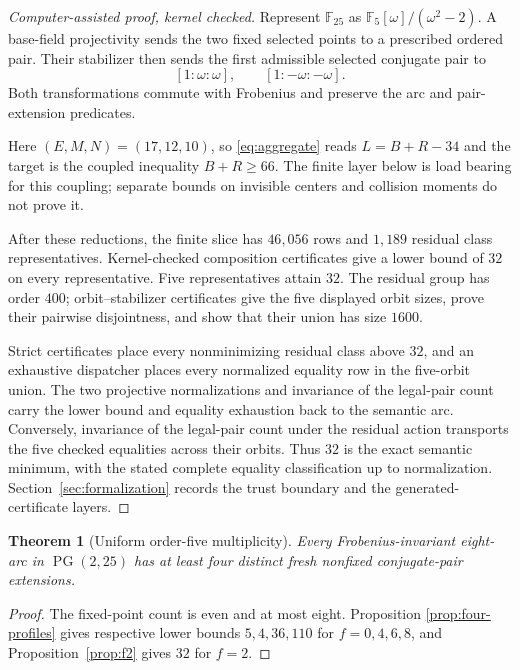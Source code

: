 \documentclass[11pt]{article}
\newtheorem{theorem}{Theorem}[section]
\theoremstyle{definition}
\theoremstyle{remark}
\newcommand{\PG}{\operatorname{PG}}
\newcommand{\F}{\mathbb{F}}
\begin{document}
\begin{proof}[Computer-assisted proof, kernel checked]
Represent $\F_{25}$ as $\F_5[\omega]/(\omega^2-2)$.  A base-field
projectivity sends the two fixed selected points to a prescribed ordered
pair.  Their stabilizer then sends the first admissible selected conjugate
pair to
\[
 [1:\omega:\omega],\qquad[1:-\omega:-\omega].
\]
Both transformations commute with Frobenius and preserve the arc and
pair-extension predicates.

Here $(E,M,N)=(17,12,10)$, so \eqref{eq:aggregate} reads
$L=B+R-34$ and the target is the coupled inequality $B+R\ge66$.
The finite layer below is load bearing for this coupling; separate bounds
on invisible centers and collision moments do not prove it.

After these reductions, the finite slice has $46{,}056$ rows and $1{,}189$
residual class representatives.  Kernel-checked composition certificates
give a lower bound of $32$ on every representative.  Five representatives
attain $32$.  The residual group has order $400$; orbit--stabilizer
certificates give the five displayed orbit sizes, prove their pairwise
disjointness, and show that their union has size $1600$.

Strict certificates place every nonminimizing residual class above $32$,
and an exhaustive dispatcher places every normalized equality row in the
five-orbit union.  The two projective normalizations and invariance of the
legal-pair count carry the lower bound and equality exhaustion back to the
semantic arc.  Conversely, invariance of the legal-pair count under the
residual action transports the five checked equalities across their orbits.
Thus $32$ is the exact semantic minimum, with the stated complete equality
classification up to normalization.  Section~\ref{sec:formalization}
records the trust boundary and the generated-certificate layers.
\end{proof}

\begin{theorem}[Uniform order-five multiplicity]\label{thm:q25}
Every Frobenius-invariant eight-arc in $\PG(2,25)$ has at least four distinct
fresh nonfixed conjugate-pair extensions.
\end{theorem}

\begin{proof}
The fixed-point count is even and at most eight.  Proposition
\ref{prop:four-profiles} gives respective lower bounds $5,4,36,110$ for
$f=0,4,6,8$, and Proposition~\ref{prop:f2} gives $32$ for $f=2$.
\end{proof}
\end{document}
